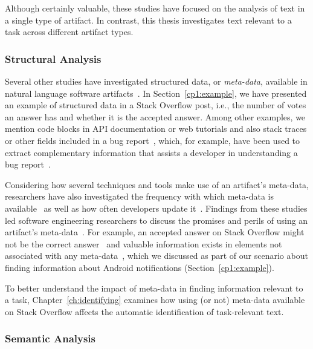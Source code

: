Although certainly valuable, these studies have focused on the analysis of 
text in a single type of artifact. In contrast, this thesis investigates 
text relevant to a task across different artifact types.





\subsubsection{Structural Analysis}

Several other studies have 
investigated structured data, or \textit{meta-data}, available in
natural language software artifacts~\cite{Ponzanelli2015}. In Section~\ref{cp1:example},
we have presented an example of structured data in a Stack Overflow post, 
i.e., the number of votes an answer has and whether it is the accepted answer.
Among other examples, we mention 
code blocks in API documentation or web tutorials 
and also stack traces or other fields included in a bug report~\cite{Davies2014, Breu2010},
which, for example, have been used to 
extract complementary 
information that assists a developer in understanding a bug report~\cite{bettenburg2008}.


Considering how several techniques and tools make use of an artifact's meta-data, 
researchers have also
investigated the frequency with which
meta-data is available~\cite{Davies2014, bettenburg2008makes, uddin2015} 
as well as how often developers update it~\cite{ahmad2018, dig2006, shi2011}.
Findings from these studies led 
software engineering researchers to discuss the promises and perils of 
using an artifact's meta-data~\cite{kalliamvakou2014, ahmad2018}.
For example, an accepted answer on Stack Overflow 
might not be the correct answer~\cite{wang2018}
and 
valuable information exists in elements not
associated with any meta-data~\cite{zhang2019so},
which we discussed as part of our 
scenario about finding information about Android notifications (Section~\ref{cp1:example}).


To better understand the impact of meta-data in finding information 
relevant to a task, Chapter~\ref{ch:identifying} 
examines how using (or not) meta-data available on 
Stack Overflow affects the automatic identification 
of task-relevant text.





\subsubsection{Semantic Analysis} 


